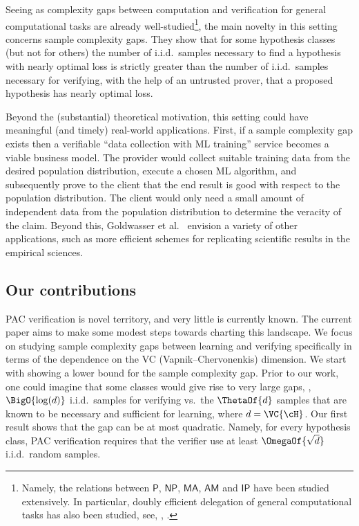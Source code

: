 Seeing as complexity gaps between computation and verification for general 
computational %
tasks %
are already well-studied\footnote{
  Namely, the relations between $\mathsf{P}$, $\mathsf{NP}$, $\mathsf{MA}$, $\mathsf{AM}$ and $\mathsf{IP}$ have been studied extensively. In particular, doubly efficient delegation of general computational tasks has also been studied,
%
see, \eg,  %
\cite{DBLP:journals/jacm/GoldwasserKR15}.
}, the main novelty in this setting concerns sample complexity gaps. They show that for some hypothesis classes (but not for others) the number of i.i.d.\ samples necessary to find a hypothesis with nearly optimal loss is strictly greater than the number of i.i.d.\ samples necessary for verifying, with the help of an untrusted prover, that a proposed hypothesis has nearly optimal loss.

Beyond the (substantial) theoretical motivation, this setting could have meaningful (and timely) real-world applications. First, if a sample complexity gap exists then a verifiable ``data collection with ML training'' service becomes a viable  business model. The provider would collect suitable training data from the desired population distribution, execute a chosen ML algorithm, and subsequently prove to the client that the end result is good with respect to the population distribution. The client would only need a small amount of independent data from the population distribution to determine the veracity of the claim. Beyond this, Goldwasser et al.\ \cite{GoldwasserRSY21} envision a variety of other applications, such as more efficient schemes for replicating scientific results in the empirical sciences.

\subsection{Our contributions}

PAC verification is novel territory, and very little is currently known. The current paper aims to make some modest steps towards charting this landscape. We focus on studying sample complexity gaps between learning and verifying specifically in terms of the dependence on the VC (Vapnik--Chervonenkis) dimension. 
We start with showing a lower bound for the sample complexity gap. Prior to our work, one could imagine that some classes would give rise to very large gaps, \eg, $\BigO{\log(d)}$ i.i.d.\ samples for verifying vs.\ the $\ThetaOf{d}$ samples that are known to be necessary and sufficient for learning, where $d = \VC{\cH}$. Our first result shows that the gap can be at most quadratic. Namely, for every hypothesis class, PAC verification requires that the verifier use at least $\OmegaOf{\sqrt{d}}$ i.i.d.\ random samples.


